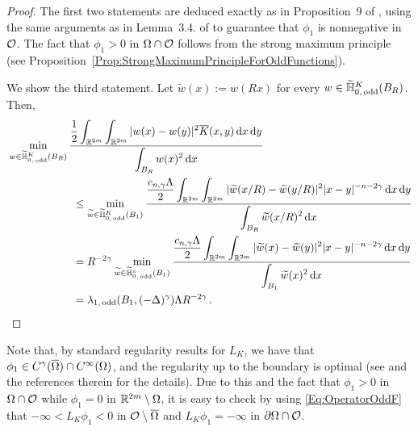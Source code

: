 \begin{proof}
	The first two statements are deduced exactly as in Proposition~9 of \cite{ServadeiValdinoci}, using the same arguments as in  Lemma~3.4. of \cite{FelipeSanz-Perela:IntegroDifferentialI} to guarantee that $\phi_1$ is nonnegative in $\mathcal{O}$. The fact that $\phi_1 > 0$ in $\Omega \cap \mathcal{O}$ follows from the strong maximum principle (see Proposition~\ref{Prop:StrongMaximumPrincipleForOddFunctions}).
	
	We show the third statement. Let $\widetilde{w} (x):= w(Rx)$ for every $w\in \widetilde{\mathbb{H}}^K_{0, \, \mathrm{odd}}(B_R)$. Then,
	\begin{align*}
	& \min_{w \in \widetilde{\mathbb{H}}^K_{0, \, \mathrm{odd}}(B_R)} \dfrac{\dfrac{1}{2}  \displaystyle\int_{\mathbb{R}^{2m}} \int_{\mathbb{R}^{2m}} |w(x) - w(y)|^2 \overline{K}(x,y) \,\mathrm{d} x \,\mathrm{d} y}{ \displaystyle \int_{B_R} w(x)^2 \,\mathrm{d} x} \quad \quad \quad \quad \quad \quad \quad \quad \quad \quad \quad \quad\\
	&   \quad \quad \quad \quad \quad \quad \leq \min_{\widetilde{w} \in \widetilde{\mathbb{H}}^K_{0, \, \mathrm{odd}}(B_1)} \dfrac{\dfrac{c_{n, \gamma}\Lambda}{2}  \displaystyle\int_{\mathbb{R}^{2m}} \int_{\mathbb{R}^{2m}} |\widetilde{w}(x/R) - \widetilde{w}(y/R)|^2 |x - y|^{-n-2 \gamma}\,\mathrm{d} x \,\mathrm{d} y}{ \displaystyle \int_{B_R} \widetilde{w}(x/R)^2 \,\mathrm{d} x}
	\\
	& \quad \quad \quad \quad \quad \quad = R^{-2 \gamma }\min_{\widetilde{w} \in \widetilde{\mathbb{H}}^s_{0, \, \mathrm{odd}}(B_1)} \dfrac{\dfrac{c_{n, \gamma}\Lambda}{2}  \displaystyle\int_{\mathbb{R}^{2m}} \int_{\mathbb{R}^{2m}} |\widetilde{w}(x) - \widetilde{w}(y)|^2 |x - y|^{-n-2 \gamma}\,\mathrm{d} x \,\mathrm{d} y}{ \displaystyle \int_{B_1} \widetilde{w}(x)^2 \,\mathrm{d} x}
	\\
	& \quad \quad \quad \quad \quad \quad = \lambda_{1, \, \mathrm{odd}}(B_1, (-\Delta)^\gamma) \Lambda R^{-2 \gamma } \,.
	\end{align*}
\end{proof}

\begin{remark}
	\label{Remark:CsRegularityFirstEigenfunction}
	Note that, by standard regularity results for $L_K$, we have that $\phi_1 \in C^\gamma(\overline{\Omega})\cap C^\infty(\Omega)$, and the regularity up to the boundary is optimal (see \cite{RosOton-Survey} and the references therein for the details). Due to this and the fact that $\phi_1 >0$ in $\Omega\cap \mathcal{O}$ while $\phi_1=0$ in $\mathbb{R}^{2m}\setminus \Omega$, it is easy to check by using \eqref{Eq:OperatorOddF} that $-\infty <L_K \phi_1 < 0$ in $\mathcal{O}\setminus \overline{\Omega}$ and $L_K \phi_1 = -\infty$ in $\partial \Omega \cap \mathcal{O}$.
\end{remark}

